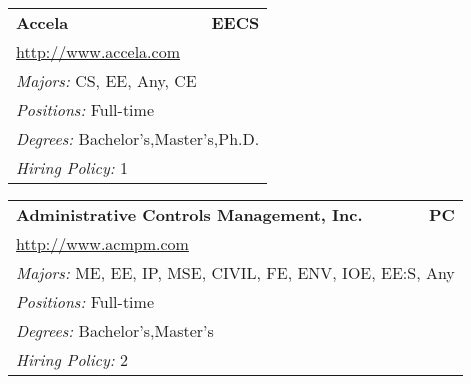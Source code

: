 \documentclass[twoside]{article}
\begin{document}
    \startcompanysection
    \begin{center}\begin{multicols}{3}
    \begin{FlushLeft}
    \begin{minipage}{.9\columnwidth}\begin{tabularx}{.95\columnwidth}{Xr}
                 {\Large\bf Accela} & {\Large\bf EECS}\\
    \multicolumn{2}{p{.95\columnwidth}}{\url{http://www.accela.com}}\\
    \multicolumn{2}{p{.95\columnwidth}}{\emph{Majors:} CS, EE, Any, CE}\\
    \multicolumn{2}{p{.95\columnwidth}}{\emph{Positions:} Full-time}\\
    \multicolumn{2}{p{.95\columnwidth}}{\emph{Degrees:} Bachelor's,Master's,Ph.D.}\\
    \multicolumn{2}{p{.95\columnwidth}}{\emph{Hiring Policy:} 1}\\
    \end{tabularx}
    
\end{minipage}
 
\begin{minipage}{.9\columnwidth}\begin{tabularx}{.95\columnwidth}{Xr}
                 {\Large\bf Administrative Controls Management, Inc.} & {\Large\bf PC}\\
    \multicolumn{2}{p{.95\columnwidth}}{\url{http://www.acmpm.com}}\\
    \multicolumn{2}{p{.95\columnwidth}}{\emph{Majors:} ME, EE, IP, MSE, CIVIL, FE, ENV, IOE, EE:S, Any}\\
    \multicolumn{2}{p{.95\columnwidth}}{\emph{Positions:} Full-time}\\
    \multicolumn{2}{p{.95\columnwidth}}{\emph{Degrees:} Bachelor's,Master's}\\
    \multicolumn{2}{p{.95\columnwidth}}{\emph{Hiring Policy:} 2}\\
    \end{tabularx}
    

\end{minipage}
\end{FlushLeft}
\end{multicols}
\end{center}
\end{document}
